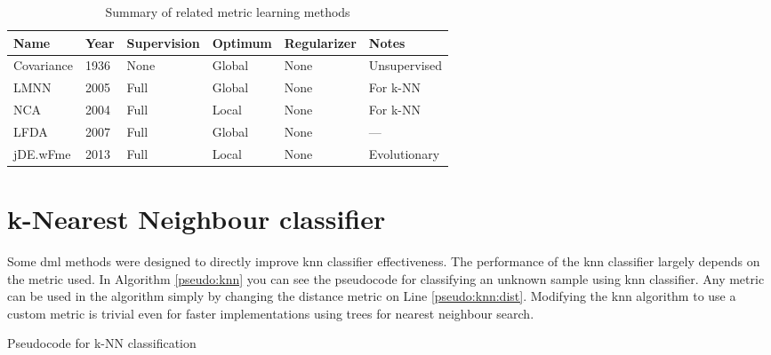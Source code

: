 \documentclass[12pt,a4paper]{report}
\begin{document}
\begin{table}[ht] \centering
\begin{tabular}{llllll}
\hline
Name & Year & Supervision & Optimum & Regularizer & Notes \\
\hline
Covariance & 1936 & None & Global & None & Unsupervised \\
LMNN & 2005 & Full & Global & None & For k-NN \\
NCA & 2004 & Full & Local & None & For k-NN \\
LFDA & 2007 & Full & Global & None & — \\
jDE.wFme & 2013 & Full & Local & None & Evolutionary \\
\hline
\end{tabular}
\caption{Summary of related metric learning methods} \label{tab:rw:summary}
\end{table}

\section{k-Nearest Neighbour classifier} \label{alg:knn}

Some \acl{dml} methods were designed to directly improve \acl{knn} classifier effectiveness. The performance of the \ac{knn} classifier largely depends on the metric used. In Algorithm \ref{pseudo:knn} you can see the pseudocode for classifying an unknown sample using \ac{knn} classifier. Any metric can be used in the algorithm simply by changing the distance metric on Line \ref{pseudo:knn:dist}. Modifying the \ac{knn} algorithm to use a custom metric is trivial even for faster implementations using trees for nearest neighbour search.

\begin{algorithm}[t]
\caption{Pseudocode for k-NN classification} \label{pseudo:knn}
\DontPrintSemicolon
\LinesNumbered
{}
\end{algorithm} 
\end{document}
